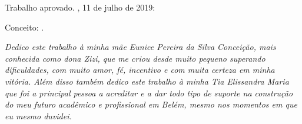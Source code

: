 \documentclass[
	12pt,				%
	openright,			%
	oneside,			%
	a4paper,			%
	english,			%
	brazil				%
	]{abntex2}
\begin{document}
%
% 
%
\begin{folhadeaprovacao}

  \begin{center}
    {\ABNTEXchapterfont\large\imprimirautor}

    \vspace*{\fill}\vspace*{\fill}
    \begin{center}
      \ABNTEXchapterfont\bfseries\Large\imprimirtitulo
    \end{center}
    \vspace*{\fill}
    
    \hspace{.45\textwidth}
    \begin{minipage}{.5\textwidth}
        \imprimirpreambulo
    \end{minipage}%
    \vspace*{\fill}
   \end{center}
        
   Trabalho aprovado. \imprimirlocal, 11 de julho de 2019:

   Conceito: .
  
      
   \begin{center}
    \vspace*{0.5cm}
    {\large\imprimirlocal}
    \par
    {\large\imprimirdata}
    \vspace*{1cm}
  \end{center}
  
\end{folhadeaprovacao}

\begin{dedicatoria}
   \vspace*{\fill}
   \centering
   \noindent
   \textit{ Dedico este trabalho à minha mãe Eunice Pereira da Silva Conceição, mais conhecida como dona Zizi, que me criou desde muito pequeno superando dificuldades, com muito amor, fé, incentivo e com muita certeza em minha vitória. Além disso também dedico este trabalho à minha Tia Elissandra Maria que foi a principal pessoa a acreditar e a dar todo tipo de suporte na construção do meu futuro acadêmico e profissional em Belém, mesmo nos momentos em que eu mesmo duvidei. } \vspace*{\fill}
\end{dedicatoria}
\end{document}
